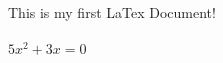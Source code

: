\documentclass[6pt]{article}
\begin{document}
This is my first LaTex Document!
\\ \\$5x^2+3x=0$
\end{document}
